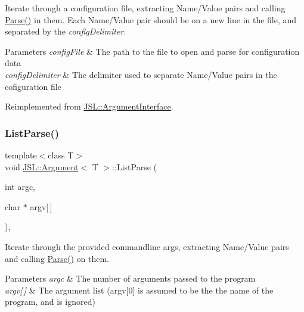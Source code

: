 Iterate through a configuration file, extracting Name/\+Value pairs and calling \hyperlink{classJSL_1_1Argument_a8984e7ce23155259d90a3e98170f36e0}{Parse()} in them. Each Name/\+Value pair should be on a new line in the file, and separated by the {\itshape config\+Delimiter}. 


\begin{DoxyParams}{Parameters}
{\em config\+File} & The path to the file to open and parse for configuration data \\
\hline
{\em config\+Delimiter} & The delimiter used to separate Name/\+Value pairs in the cofiguration file \\
\hline
\end{DoxyParams}


Reimplemented from \hyperlink{classJSL_1_1ArgumentInterface_aac7c3106f99c407e625b9bc6a6c8c446}{J\+S\+L\+::\+Argument\+Interface}.

\mbox{\label{classJSL_1_1Argument_aa2b18bb35e90f91e224a06d60835053a}} 
\subsubsection{\texorpdfstring{List\+Parse()}{ListParse()}}
{\footnotesize\ttfamily template$<$class T$>$ \\
void \hyperlink{classJSL_1_1Argument}{J\+S\+L\+::\+Argument}$<$ T $>$\+::List\+Parse (\begin{DoxyParamCaption}\item[{int}]{argc,  }\item[{char $\ast$}]{argv\mbox{[}$\,$\mbox{]} }\end{DoxyParamCaption})\hspace{0.3cm}{\ttfamily [inline]}, {\ttfamily [virtual]}}



Iterate through the provided commandline args, extracting Name/\+Value pairs and calling \hyperlink{classJSL_1_1Argument_a8984e7ce23155259d90a3e98170f36e0}{Parse()} on them. 


\begin{DoxyParams}{Parameters}
{\em argc} & The number of arguments passed to the program \\
\hline
{\em argv\mbox{[}$\,$\mbox{]}} & The argument list (argv\mbox{[}0\mbox{]} is assumed to be the the name of the program, and is ignored) \\
\hline
\end{DoxyParams}


